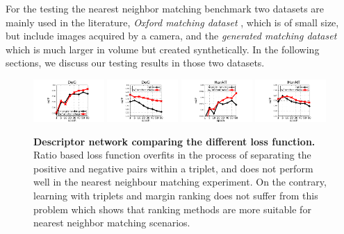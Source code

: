 For the testing the nearest neighbor matching benchmark two datasets are mainly used in the literature, {\em Oxford matching dataset} \cite{schmid2003performance}, which is of small size, but include images acquired by a camera, and the {\em generated matching dataset} \cite{FDB14} which is much larger in volume but created synthetically. In the following sections, we discuss our testing results in those two datasets.

\begin{figure}
\centering    
\includegraphics[trim={2.1cm 0 2.1cm 0},width=0.24\textwidth]{main/chapter02/images/dog_ranking}
\includegraphics[trim={2.1cm 0 2.1cm
0},width=0.24\textwidth]{main/chapter02/images/dog_ratio}
\includegraphics[trim={2.1cm 0 2.1cm 0},width=0.24\textwidth]{main/chapter02/images/haraff_ranking}
\includegraphics[trim={2.1cm 0 2.1cm 0},width=0.24\textwidth]{main/chapter02/images/haraff_ratio}
\caption[Descriptor network comparing the different loss function]{\textbf{Descriptor network comparing the different loss function.} Ratio based loss function overfits in the process of
   separating the positive and negative pairs within a
  triplet, and does not perform well in the nearest neighbour
  matching experiment. On the contrary, learning with triplets and
  margin ranking does not suffer from this problem which shows
  that ranking methods are more suitable for nearest neighbor
  matching scenarios.}
\label{fig:losses-vs}
\vspace{-0.1cm}
\end{figure}

